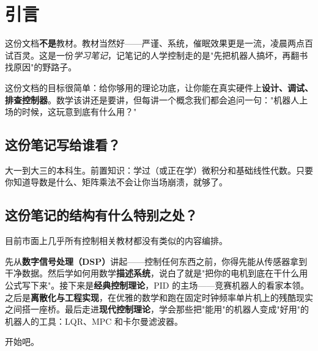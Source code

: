 \section{引言}

这份文档\textbf{不是}教材。教材当然好——严谨、系统，催眠效果更是一流，凌晨两点百试百灵。这是一份\textit{学习笔记}，记笔记的人学控制走的是"先把机器人搞坏，再翻书找原因"的野路子。

这份文档的目标很简单：给你够用的理论功底，让你能在真实硬件上\textbf{设计、调试、排查控制器}。数学该讲还是要讲，但每讲一个概念我们都会追问一句："机器人上场的时候，这玩意到底有什么用？"

\subsection*{这份笔记写给谁看？}

大一到大三的本科生。前置知识：学过（或正在学）微积分和基础线性代数。只要你知道导数是什么、矩阵乘法不会让你当场崩溃，就够了。

\subsection*{这份笔记的结构有什么特别之处？}

目前市面上几乎所有控制相关教材都没有类似的内容编排。

先从\textbf{数字信号处理（DSP）}讲起——控制任何东西之前，你得先能从传感器拿到干净数据。然后学如何用数学\textbf{描述系统}，说白了就是"把你的电机到底在干什么用公式写下来"。接下来是\textbf{经典控制理论}，PID 的主场——竞赛机器人的看家本领。之后是\textbf{离散化与工程实现}，在优雅的数学和跑在固定时钟频率单片机上的残酷现实之间搭一座桥。最后走进\textbf{现代控制理论}，学会那些把"能用"的机器人变成"好用"的机器人的工具：LQR、MPC 和卡尔曼滤波器。

开始吧。
